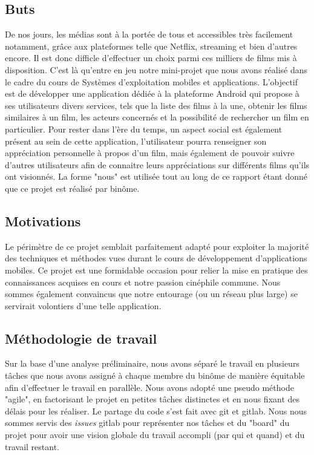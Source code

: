 
\subsection{Buts}
De nos jours, les médias sont à la portée de tous et accessibles très facilement notamment, grâce aux plateformes telle que Netflix, streaming et bien d'autres encore. Il est donc difficle d'effectuer un choix parmi ces milliers de films mis à disposition. C'est là qu'entre en jeu notre mini-projet que nous avons réalisé dans le cadre du cours de Systèmes d'exploitation mobiles et applications. L'objectif est de développer une application dédiée à la plateforme Android qui propose à ses utilisateurs divers services, tels que la liste des films à la une, obtenir les films similaires à un film, les acteurs concernés et la possibilité de rechercher un film en particulier.
Pour rester dans l'ère du temps, un aspect social est également présent au sein de cette application, l'utilisateur pourra renseigner son appréciation personnelle à propos d'un film, mais également de pouvoir suivre d'autres utilisateurs afin de connaitre leurs appréciations sur différents films qu'ils ont visionnés.
La forme "nous" est utilisée tout au long de ce rapport étant donné que ce projet est réalisé par binôme.

\subsection{Motivations}
Le périmètre de ce projet semblait parfaitement adapté pour exploiter la majorité des techniques et méthodes vues durant le cours de développement d'applications mobiles.
Ce projet est une formidable occasion pour relier la mise en pratique des connaissances acquises en cours et notre passion cinéphile commune. Nous sommes également convaincus que notre entourage (ou un réseau plus large) se servirait volontiers d'une telle application.

\subsection{Méthodologie de travail}
Sur la base d'une analyse préliminaire, nous avons séparé le travail en plusieurs tâches que nous avons assigné à chaque membre du binôme de manière équitable afin d'effectuer le travail en parallèle.
Nous avons adopté une pseudo méthode "agile", en factorisant le projet en petites tâches distinctes et en nous fixant des délais pour les réaliser. Le partage du code s'est fait avec git et gitlab. Nous nous sommes servis des \textit{issues} gitlab pour représenter nos tâches et du "board" du projet pour avoir une vision globale du travail accompli (par qui et quand) et du travail restant.
